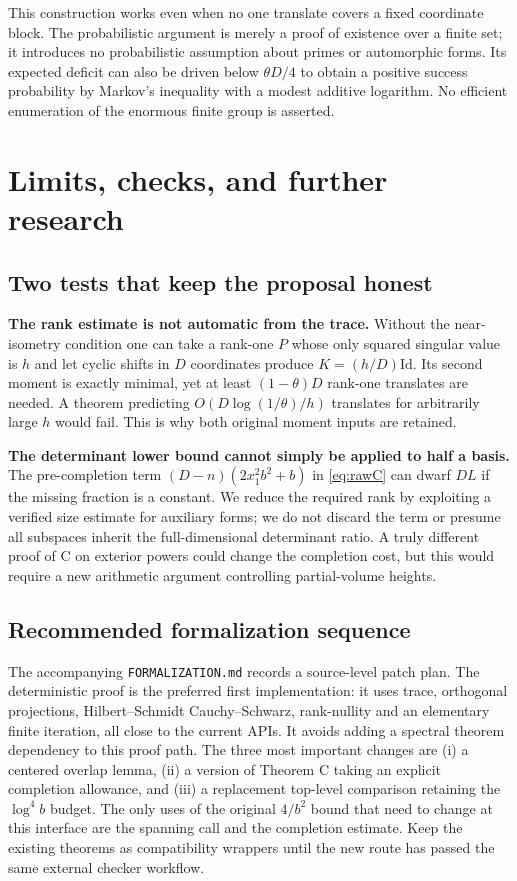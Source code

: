\documentclass[11pt]{article}
\theoremstyle{remark}\newtheorem{remark}[theorem]{Remark}
\newcommand{\id}{\mathrm{Id}}
\begin{document}
This construction works even when no one translate covers a fixed coordinate block. The probabilistic argument is merely a proof of existence over a finite set; it introduces no probabilistic assumption about primes or automorphic forms. Its expected deficit can also be driven below $\theta D/4$ to obtain a positive success probability by Markov's inequality with a modest additive logarithm. No efficient enumeration of the enormous finite group is asserted.

\section{Limits, checks, and further research}
\subsection{Two tests that keep the proposal honest}
\textbf{The rank estimate is not automatic from the trace.} Without the near-isometry condition one can take a rank-one $P$ whose only squared singular value is $h$ and let cyclic shifts in $D$ coordinates produce $K=(h/D)\id$. Its second moment is exactly minimal, yet at least $(1-\theta)D$ rank-one translates are needed. A theorem predicting $O(D\log(1/\theta)/h)$ translates for arbitrarily large $h$ would fail. This is why both original moment inputs are retained.

\textbf{The determinant lower bound cannot simply be applied to half a basis.} The pre-completion term $(D-n)(2x_1^2b^2+b)$ in \eqref{eq:rawC} can dwarf $DL$ if the missing fraction is a constant. We reduce the required rank by exploiting a verified size estimate for auxiliary forms; we do not discard the term or presume all subspaces inherit the full-dimensional determinant ratio. A truly different proof of C on exterior powers could change the completion cost, but this would require a new arithmetic argument controlling partial-volume heights.

\subsection{Recommended formalization sequence}
The accompanying \texttt{FORMALIZATION.md} records a source-level patch plan. The deterministic proof is the preferred first implementation: it uses trace, orthogonal projections, Hilbert--Schmidt Cauchy--Schwarz, rank-nullity and an elementary finite iteration, all close to the current APIs. It avoids adding a spectral theorem dependency to this proof path. The three most important changes are (i) a centered overlap lemma, (ii) a version of Theorem C taking an explicit completion allowance, and (iii) a replacement top-level comparison retaining the $\log^4 b$ budget. The only uses of the original $4/b^2$ bound that need to change at this interface are the spanning call and the completion estimate. Keep the existing theorems as compatibility wrappers until the new route has passed the same external checker workflow.
\end{document}
